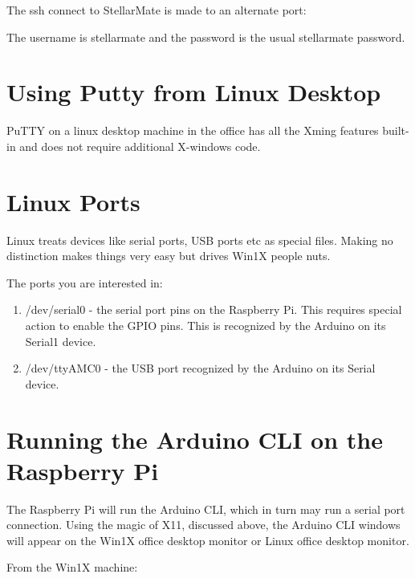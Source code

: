The ssh connect to StellarMate is made to an alternate port:


The username is stellarmate and the password is the usual stellarmate password.

\section{Using Putty from Linux Desktop} \label{sec:LinuxDesktop}

PuTTY on a linux desktop machine in the office has all the Xming features
built-in and does not require additional X-windows code.

\section{Linux Ports}

Linux treats devices like serial ports, USB ports etc as special
files. Making no distinction makes things very easy but drives
Win1X people nuts.

The ports you are interested in:

\vspace{-.15cm}
\begin{enumerate}\addtolength{\itemsep}{-0.5\baselineskip}
   \item   /dev/serial0 - the serial port pins on the Raspberry Pi. This requires 
special action to enable the GPIO pins. This is recognized by the Arduino on its Serial1
 device.
   \item   /dev/ttyAMC0 - the USB port recognized by the Arduino on its Serial
 device.
\end{enumerate}

\section{Running the Arduino CLI on the Raspberry Pi}

The Raspberry Pi will run the Arduino CLI, which in turn may run a
serial port connection. Using the magic of X11, discussed above, the
Arduino CLI windows will appear on the Win1X office desktop monitor or
Linux office desktop monitor.

From the Win1X machine:

